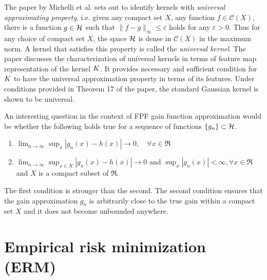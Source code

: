 The paper by Michelli et al. \cite{micchaxuzha06} sets out to identify kernels with \textit{universal approximating property}, i.e. given any compact set $X$, any function $f \in \mathcal{C}(X)$, there is a function $g \in {\cal H}$ such that $\| f - g\|_{\infty} \leq \varepsilon$ holds for any $\varepsilon > 0$. Thus for any choice of compact set $X$, the space ${\cal H}$ is dense in $\mathcal{C}(X)$ in the maximum norm. A kernel that satisfies this property is called the \textit{universal kernel}. The paper discusses the characterization of universal kernels in terms of feature map representation of the kernel $K$. It provides necessary and sufficient condition for $K$ to have the universal approximation property in terms of its features. Under conditions provided in Theorem 17 of the paper, the standard Gaussian kernel is shown to be universal. 


An interesting question in the context of FPF gain function approximation would be whether the following holds true for a sequence of functions $\{g_n\} \subset {\cal H}$.
\begin{enumerate}
\item $\lim_{n \to \infty} \sup_x |g_n(x) -h(x) | \to 0,\quad \forall x \in \Re$
\item $ \lim_{n \to \infty}\sup_{x \in X} |g_n(x) - h(x) | \to 0$ and $\sup_x |g_n(x)| < \infty,  \forall x \in \Re$ and $X$ is a compact subset of $\Re$. 
\end{enumerate}
The first condition is stronger than the second. The second condition ensures that the gain approximation $g_n$ is arbitrarily close to the true gain within a compact set $X$ and it does not become unbounded anywhere. 


\section{Empirical risk minimization (ERM)}
\label{s:erm}

